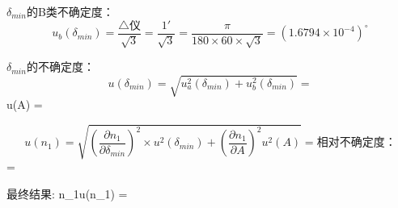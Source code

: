 ${\delta}_{min}$的B类不确定度：
$$u_b({\delta}_{min})=\displaystyle\frac{\bigtriangleup\text{仪}}{\sqrt{3}}
= \frac{1'}{\sqrt{3}} = \frac{\pi}{180\times60\times\sqrt{3}} = (1.6794 \times 10^{-4})^{\circ} $$

${\delta}_{min}$的不确定度：
$$u({\delta}_{min}) = \sqrt{u^2_a({\delta}_{min})+u^2_b({\delta}_{min})} = %

$$u(A) = %

$$u(n_1) = \sqrt{(\displaystyle\frac{{\partial}n_1}{{\partial}{\delta}_{min}})^2{\times}u^2({\delta}_{min})+(\displaystyle\frac{{\partial}n_1}{{\partial}A})^2u^2(A)} = %

相对不确定度：
$$\displaystyle{} = %

最终结果:
$${n_1}{\pm}u({n_1}) = %